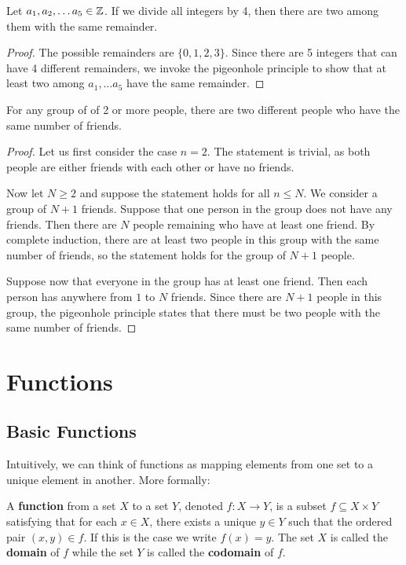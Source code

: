 \begin{propbox}
   Let $a_1, a_2, \dots a_5 \in \mathbb{Z}$. If we divide all integers by 4, then there are two among them with the same remainder.
\end{propbox}
\begin{proof}
   The possible remainders are $\{0, 1, 2, 3\}$. Since there are 5 integers that can have 4 different remainders, we invoke the pigeonhole principle to show that at least two among $a_1, \dots a_5$ have the same remainder. 
\end{proof}

\begin{propbox}
   For any group of of 2 or more people, there are two different people who have the same number of friends.
\end{propbox}
\begin{proof}
   Let us first consider the case $n = 2$. The statement is trivial, as both people are either friends with each other or have no friends. 

   Now let $N \geq 2$ and suppose the statement holds for all $n \leq N$. We consider a group of $N + 1$ friends. Suppose that one person in the group does not have any friends. Then there are $N$ people remaining who have at least one friend. By complete induction, there are at least two people in this group with the same number of friends, so the statement holds for the group of $N + 1$ people.   

   Suppose now that everyone in the group has at least one friend. Then each person has anywhere from $1$ to $N$ friends. Since there are $N + 1$ people in this group, the pigeonhole principle states that there must be two people with the same number of friends. 
\end{proof}

\section{Functions}

\subsection{Basic Functions}

Intuitively, we can think of functions as mapping elements from one set to a unique element in another. More formally:

\begin{defbox}
   A \textbf{function} from a set $X$ to a set $Y$, denoted $f \colon X \to Y$, is a subset $f \subseteq X \times Y$ satisfying that for each $x \in X$, there exists a unique $y \in Y$ such that the ordered pair $(x, y) \in f$. If this is the case we write $f(x) = y$. The set $X$ is called the \textbf{domain} of $f$ while the set $Y$ is called the \textbf{codomain} of $f$.
\end{defbox}

